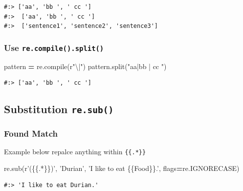 \documentclass[
]{book}
\newenvironment{Shaded}{\begin{snugshade}}{\end{snugshade}}
\newcommand{\BuiltInTok}[1]{#1}
\newcommand{\NormalTok}[1]{#1}
\newcommand{\OperatorTok}[1]{\textcolor[rgb]{0.43,0.43,0.43}{\textbf{#1}}}
\newcommand{\SpecialCharTok}[1]{\textcolor[rgb]{0,0,0}{#1}}
\newcommand{\StringTok}[1]{\textcolor[rgb]{0.5,0.5,0.5}{#1}}
\newcommand{\VerbatimStringTok}[1]{\textcolor[rgb]{0.5,0.5,0.5}{#1}}
\begin{document}
\begin{verbatim}
#:> ['aa', 'bb ', ' cc '] 
#:>  ['aa', 'bb ', ' cc '] 
#:>  ['sentence1', 'sentence2', 'sentence3']
\end{verbatim}

\hypertarget{use-re.compile.split}{%
\subsubsection{\texorpdfstring{Use \texttt{re.compile().split()}}{Use re.compile().split()}}\label{use-re.compile.split}}

\begin{Shaded}
\begin{Highlighting}[]
\NormalTok{pattern }\OperatorTok{=}\NormalTok{ re.}\BuiltInTok{compile}\NormalTok{(}\VerbatimStringTok{r"\textbackslash{}|"}\NormalTok{)}
\NormalTok{pattern.split(}\StringTok{"aa|bb | cc "}\NormalTok{)}
\end{Highlighting}
\end{Shaded}

\begin{verbatim}
#:> ['aa', 'bb ', ' cc ']
\end{verbatim}

\hypertarget{substitution-re.sub}{%
\subsection{\texorpdfstring{Substitution \texttt{re.sub()}}{Substitution re.sub()}}\label{substitution-re.sub}}

\hypertarget{found-match}{%
\subsubsection{Found Match}\label{found-match}}

Example below repalce anything within \texttt{\{\{.*\}\}}

\begin{Shaded}
\begin{Highlighting}[]
\NormalTok{re.sub(}\VerbatimStringTok{r'(}\SpecialCharTok{\{\{}\VerbatimStringTok{.*}\SpecialCharTok{\}\}}\VerbatimStringTok{)'}\NormalTok{, }\StringTok{'Durian'}\NormalTok{, }\StringTok{'I like to eat }\SpecialCharTok{\{\{}\StringTok{Food}\SpecialCharTok{\}\}}\StringTok{.'}\NormalTok{, flags}\OperatorTok{=}\NormalTok{re.IGNORECASE)}
\end{Highlighting}
\end{Shaded}

\begin{verbatim}
#:> 'I like to eat Durian.'
\end{verbatim}
\end{document}
